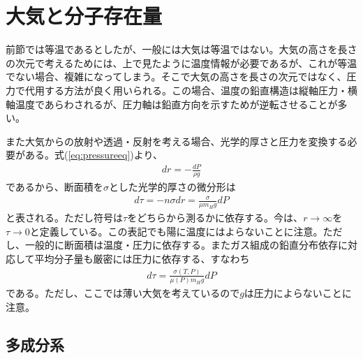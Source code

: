 \section{大気と分子存在量}

前節では等温であるとしたが、一般には大気は等温ではない。大気の高さを長さの次元で考えるためには、上で見たように温度情報が必要であるが、これが等温でない場合、複雑になってしまう。そこで大気の高さを長さの次元ではなく、圧力で代用する方法が良く用いられる。この場合、温度の鉛直構造は縦軸圧力・横軸温度であらわされるが、圧力軸は鉛直方向を示すためが逆転させることが多い。


また大気からの放射や透過・反射を考える場合、光学的厚さと圧力を変換する必要がある。式(\ref{eq:pressureeq})より、
\begin{eqnarray}
\label{eq:drdp}
d r = - \frac{d P}{\rho g} 
\end{eqnarray}
であるから、断面積を$\sigma$とした光学的厚さの微分形は
\begin{eqnarray}
d \tau = - n \sigma d r = \frac{\sigma}{\mu m_H g} d P  
\end{eqnarray}
と表される。ただし符号は$\tau$をどちらから測るかに依存する。今は、$r \to \infty$を$\tau \to 0$と定義している。この表記でも陽に温度にはよらないことに注意。ただし、一般的に断面積は温度・圧力に依存する。またガス組成の鉛直分布依存に対応して平均分子量も厳密には圧力に依存する、すなわち
\begin{eqnarray}
\label{eq:dtaudP}
d \tau = \frac{\sigma(T,P)}{\mu (P) m_H g} d P  
\end{eqnarray}
である。ただし、ここでは薄い大気を考えているので$g$は圧力によらないことに注意。\\

\subsection*{多成分系}


